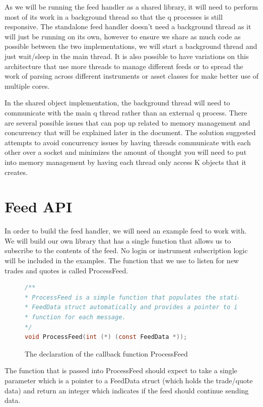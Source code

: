 As we will be running the feed handler as a shared library, it will need to
perform most of its work in a background thread so that the q processes is
still responsive. The standalone feed handler doesn't need a background thread
as it will just be running on its own, however to ensure we share as much code
as possible between the two implementations, we will start a background thread
and just wait/sleep in the main thread. It is also possible to have variations
on this architecture that use more threads to manage different feeds or to spread
the work of parsing across different instruments or asset classes for make better
use of multiple cores.

In the shared object implementation, the background thread will need to communicate
with the main q thread rather than an external q process. There are several possible
issues that can pop up related to memory management and concurrency that will be
explained later in the document. The solution suggested attempts to avoid concurrency
issues by having threads communicate with each other over a socket and minimizes the
amount of thought you will need to put into memory management by having each thread
only access K objects that it creates.

\section{Feed API}

In order to build the feed handler, we will need an example feed to work with.
We will build our own library that has a single function that allows us to
subscribe to the contents of the feed. No login or instrument subscription
logic will be included in the examples. The function that we use to listen for
new trades and quotes is called ProcessFeed.

\begin{figure}
\begin{lstlisting}[language=C]
/**
* ProcessFeed is a simple function that populates the statically allocated
* FeedData struct automatically and provides a pointer to it via a callback
* function for each message.
*/
void ProcessFeed(int (*) (const FeedData *));
\end{lstlisting}
\caption{The declaration of the callback function ProcessFeed}
\end{figure}

The function that is passed into ProcessFeed should expect to take a single parameter
which is a pointer to a FeedData struct (which holds the trade/quote data) and return
an integer which indicates if the feed should continue sending data.

